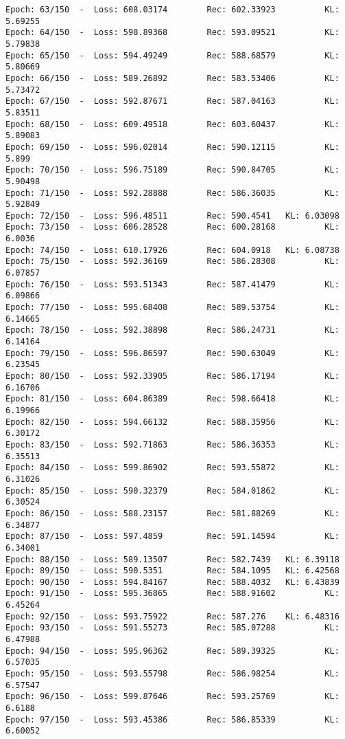 \documentclass[11pt]{article}
\begin{document}
\begin{Verbatim}[commandchars=\\\{\}]
Epoch: 63/150  -  Loss: 608.03174        Rec: 602.33923          KL: 5.69255
Epoch: 64/150  -  Loss: 598.89368        Rec: 593.09521          KL: 5.79838
Epoch: 65/150  -  Loss: 594.49249        Rec: 588.68579          KL: 5.80669
Epoch: 66/150  -  Loss: 589.26892        Rec: 583.53406          KL: 5.73472
Epoch: 67/150  -  Loss: 592.87671        Rec: 587.04163          KL: 5.83511
Epoch: 68/150  -  Loss: 609.49518        Rec: 603.60437          KL: 5.89083
Epoch: 69/150  -  Loss: 596.02014        Rec: 590.12115          KL: 5.899
Epoch: 70/150  -  Loss: 596.75189        Rec: 590.84705          KL: 5.90498
Epoch: 71/150  -  Loss: 592.28888        Rec: 586.36035          KL: 5.92849
Epoch: 72/150  -  Loss: 596.48511        Rec: 590.4541   KL: 6.03098
Epoch: 73/150  -  Loss: 606.28528        Rec: 600.28168          KL: 6.0036
Epoch: 74/150  -  Loss: 610.17926        Rec: 604.0918   KL: 6.08738
Epoch: 75/150  -  Loss: 592.36169        Rec: 586.28308          KL: 6.07857
Epoch: 76/150  -  Loss: 593.51343        Rec: 587.41479          KL: 6.09866
Epoch: 77/150  -  Loss: 595.68408        Rec: 589.53754          KL: 6.14665
Epoch: 78/150  -  Loss: 592.38898        Rec: 586.24731          KL: 6.14164
Epoch: 79/150  -  Loss: 596.86597        Rec: 590.63049          KL: 6.23545
Epoch: 80/150  -  Loss: 592.33905        Rec: 586.17194          KL: 6.16706
Epoch: 81/150  -  Loss: 604.86389        Rec: 598.66418          KL: 6.19966
Epoch: 82/150  -  Loss: 594.66132        Rec: 588.35956          KL: 6.30172
Epoch: 83/150  -  Loss: 592.71863        Rec: 586.36353          KL: 6.35513
Epoch: 84/150  -  Loss: 599.86902        Rec: 593.55872          KL: 6.31026
Epoch: 85/150  -  Loss: 590.32379        Rec: 584.01862          KL: 6.30524
Epoch: 86/150  -  Loss: 588.23157        Rec: 581.88269          KL: 6.34877
Epoch: 87/150  -  Loss: 597.4859         Rec: 591.14594          KL: 6.34001
Epoch: 88/150  -  Loss: 589.13507        Rec: 582.7439   KL: 6.39118
Epoch: 89/150  -  Loss: 590.5351         Rec: 584.1095   KL: 6.42568
Epoch: 90/150  -  Loss: 594.84167        Rec: 588.4032   KL: 6.43839
Epoch: 91/150  -  Loss: 595.36865        Rec: 588.91602          KL: 6.45264
Epoch: 92/150  -  Loss: 593.75922        Rec: 587.276    KL: 6.48316
Epoch: 93/150  -  Loss: 591.55273        Rec: 585.07288          KL: 6.47988
Epoch: 94/150  -  Loss: 595.96362        Rec: 589.39325          KL: 6.57035
Epoch: 95/150  -  Loss: 593.55798        Rec: 586.98254          KL: 6.57547
Epoch: 96/150  -  Loss: 599.87646        Rec: 593.25769          KL: 6.6188
Epoch: 97/150  -  Loss: 593.45386        Rec: 586.85339          KL: 6.60052

\end{Verbatim}
\end{document}
